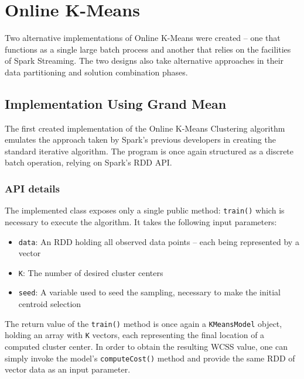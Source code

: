 \documentclass{l4proj}
\begin{document}

\chapter{Online K-Means}
\label{online}

Two alternative implementations of Online K-Means were created -- one that functions as a single large batch process and another that relies on the facilities of Spark Streaming. The two designs also take alternative approaches in their data partitioning and solution combination phases.

\section{Implementation Using Grand Mean}

The first created implementation of the Online K-Means Clustering algorithm emulates the approach taken by Spark's previous developers in creating the standard iterative algorithm. The program is once again structured as a discrete batch operation, relying on Spark's RDD API.

\subsection{API details}

The implemented class exposes only a single public method: \texttt{train()} which is necessary to execute the algorithm. It takes the following input parameters:

\begin{itemize}
\item \texttt{data}: An RDD holding all observed data points -- each being represented by a vector
\item \texttt{K}: The number of desired cluster centers
\item \texttt{seed}: A variable used to seed the sampling, necessary to make the initial centroid selection
\end{itemize}

The return value of the \texttt{train()} method is once again a  \texttt{KMeansModel} object, holding an array with \texttt{K} vectors, each representing the final location of a computed cluster center. In order to obtain the resulting WCSS value, one can simply invoke the model's \texttt{computeCost()} method and provide the same RDD of vector data as an input parameter.
\end{document}
